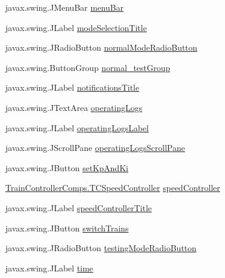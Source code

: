 \begin{DoxyCompactItemize}
javax.\+swing.\+J\+Menu\+Bar \hyperlink{classTrainControllerComps_1_1TrainController_a43089d5e4ea6c55ecd04454f6b0983fa}{menu\+Bar}
\item 
javax.\+swing.\+J\+Label \hyperlink{classTrainControllerComps_1_1TrainController_a5b0e6ae78fd9fc96546a349ff351387b}{mode\+Selection\+Title}
\item 
javax.\+swing.\+J\+Radio\+Button \hyperlink{classTrainControllerComps_1_1TrainController_aa6f8d34e9769e35ada009950a79a4834}{normal\+Mode\+Radio\+Button}
\item 
javax.\+swing.\+Button\+Group \hyperlink{classTrainControllerComps_1_1TrainController_a69f24a4359e0b261401b9adbddd79354}{normal\+\_\+test\+Group}
\item 
javax.\+swing.\+J\+Label \hyperlink{classTrainControllerComps_1_1TrainController_a49d44ccdd2be91a251a33bbbf57c8b96}{notifications\+Title}
\item 
javax.\+swing.\+J\+Text\+Area \hyperlink{classTrainControllerComps_1_1TrainController_ab88996a242fe55fd7541b534cc8307f1}{operating\+Logs}
\item 
javax.\+swing.\+J\+Label \hyperlink{classTrainControllerComps_1_1TrainController_a7b8385a1b0eba114bdb5e159cccfe6c0}{operating\+Logs\+Label}
\item 
javax.\+swing.\+J\+Scroll\+Pane \hyperlink{classTrainControllerComps_1_1TrainController_abd6dceef250d6c8984db7f465f660035}{operating\+Logs\+Scroll\+Pane}
\item 
javax.\+swing.\+J\+Button \hyperlink{classTrainControllerComps_1_1TrainController_ae3cd4e9b4b470fb95b9da4eba7be53f0}{set\+Kp\+And\+Ki}
\item 
\hyperlink{classTrainControllerComps_1_1TCSpeedController}{Train\+Controller\+Comps.\+T\+C\+Speed\+Controller} \hyperlink{classTrainControllerComps_1_1TrainController_a3367a33be1fb5e4c9e2cd38d10866911}{speed\+Controller}
\item 
javax.\+swing.\+J\+Label \hyperlink{classTrainControllerComps_1_1TrainController_ae0c6b030114914523d6cae9b02f45737}{speed\+Controller\+Title}
\item 
javax.\+swing.\+J\+Button \hyperlink{classTrainControllerComps_1_1TrainController_a8fd16e8e45db6ef47c20117a07549e51}{switch\+Trains}
\item 
javax.\+swing.\+J\+Radio\+Button \hyperlink{classTrainControllerComps_1_1TrainController_a5864e5ed0e60aa89c232d4ad7b0e7954}{testing\+Mode\+Radio\+Button}
\item 
javax.\+swing.\+J\+Label \hyperlink{classTrainControllerComps_1_1TrainController_a4d40c430ee6a9e91944e09e83d4bbed7}{time}

\end{DoxyCompactItemize}

